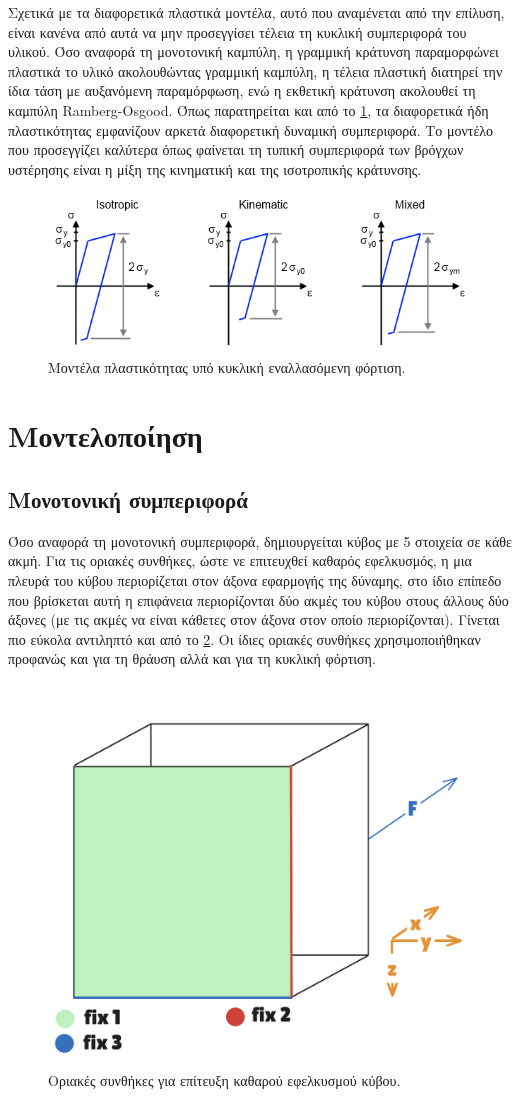 \documentclass{article}
\begin{document}
Σχετικά με τα διαφορετικά πλαστικά μοντέλα, αυτό που αναμένεται από την επίλυση, είναι κανένα από αυτά να μην προσεγγίσει τέλεια τη κυκλική συμπεριφορά του υλικού. Όσο αναφορά τη μονοτονική καμπύλη, η γραμμική κράτυνση παραμορφώνει πλαστικά το υλικό ακολουθώντας γραμμική καμπύλη, η τέλεια πλαστική διατηρεί την ίδια τάση με αυξανόμενη παραμόρφωση, ενώ η εκθετική κράτυνση ακολουθεί τη καμπύλη Ramberg-Osgood. Όπως παρατηρείται και από το \ref{fig:hard}, τα διαφορετικά ήδη πλαστικότητας εμφανίζουν αρκετά διαφορετική δυναμική συμπεριφορά. Το μοντέλο που προσεγγίζει καλύτερα όπως φαίνεται τη τυπική συμπεριφορά των βρόγχων υστέρησης είναι η μίξη της κινηματική και της ισοτροπικής κράτυνσης.
\begin{figure}[H]
    \centering
    \includegraphics[width=0.6\linewidth]{media/hard.png}
    \caption{Μοντέλα πλαστικότητας υπό κυκλική εναλλασόμενη φόρτιση.}
    \label{fig:hard}
\end{figure} 

\section{Μοντελοποίηση}

\subsection{Μονοτονική συμπεριφορά}
Όσο αναφορά τη μονοτονική συμπεριφορά, δημιουργείται κύβος με 5 στοιχεία σε κάθε ακμή. Για τις οριακές συνθήκες, ώστε νε επιτευχθεί καθαρός εφελκυσμός, η μια πλευρά του κύβου περιορίζεται στον άξονα εφαρμογής της δύναμης, στο ίδιο επίπεδο που βρίσκεται αυτή η επιφάνεια περιορίζονται δύο ακμές του κύβου στους άλλους δύο άξονες (με τις ακμές να είναι κάθετες στον άξονα στον οποίο περιορίζονται). Γίνεται πιο εύκολα αντιληπτό και από το \ref{fig:bcs}. Οι ίδιες οριακές συνθήκες χρησιμοποιήθηκαν προφανώς και για τη θράυση αλλά και για τη κυκλική φόρτιση.

\begin{figure}[H]
    \centering
    \includegraphics[width=0.4\linewidth]{media/bcs.png}
    \caption{Οριακές συνθήκες για επίτευξη καθαρού εφελκυσμού κύβου.}
    \label{fig:bcs}
\end{figure}
\end{document}
